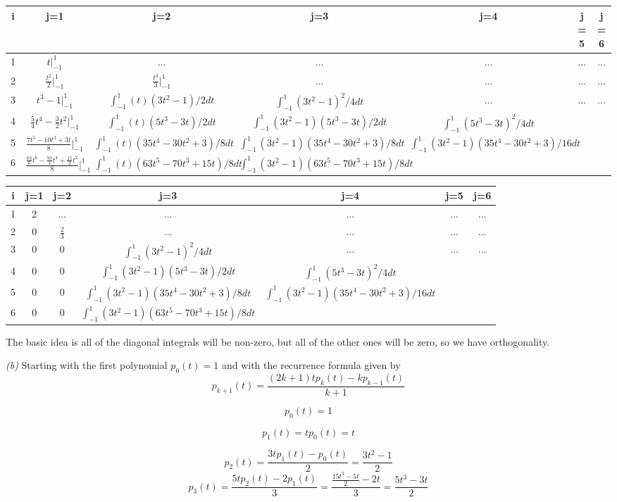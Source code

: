 \documentclass[12pt]{article}
\newenvironment{problem}[2][Problem]{\begin{trivlist}
\item[\hskip \labelsep {\bfseries #1}\hskip \labelsep {\bfseries #2.}]}{\end{trivlist}}
\begin{document}
\begin{problem}{7.10}
\begin{tabular}{|c|c|c|c|c|c| c|}
\hline
i&j=1&j=2&j=3&j=4&j=5&j=6\\
\hline
1&$t\vert_{-1}^{1}$&...&...&...&...&...\\
2&$\frac{t^2}{2}\vert_{-1}^{1}$&$\frac{t^3}{3}\vert_{-1}^{1}$&...&...&...&...\\
3&$t^3-1\vert_{-1}^{1}$&$\int_{-1}^{1}(t)(3t^2-1)/2dt$&$\int_{-1}^{1}(3t^2-1)^2/4dt$&...&...&...\\
4&$\frac{5}{4}t^4-\frac{3}{2}t^2\vert_{-1}^{1}$&$\int_{-1}^{1}(t)(5t^3-3t)/2dt$&$\int_{-1}^{1}(3t^2-1)(5t^3-3t)/2dt$&$\int_{-1}^{1}(5t^3-3t)^2/4dt$\\
5&$\frac{7t^5-10t^3+3t}{8}\vert_{-1}^{1}$&$\int_{-1}^{1}(t)(35t^4-30t^2+3)/8dt$&$\int_{-1}^{1}(3t^2-1)(35t^4-30t^2+3)/8dt$&$\int_{-1}^{1}(3t^2-1)(35t^4-30t^2+3)/16dt$\\
6&$\frac{\frac{63}{6}t^6-\frac{70}{4}t^4+\frac{15}{2}t^2}{8}\vert_{-1}^{1}$&$\int_{-1}^{1}(t)(63t^5-70t^3+15t)/8dt$&$\int_{-1}^{1}(3t^2-1)(63t^5-70t^3+15t)/8dt$\\
\hline
\end{tabular}

\begin{tabular}{|c|c|c|c|c|c| c|}
\hline
i&j=1&j=2&j=3&j=4&j=5&j=6\\
\hline
1&2&...&...&...&...&...\\
2&0&$\frac{2}{3}$&...&...&...&...\\
3&0&0&$\int_{-1}^{1}(3t^2-1)^2/4dt$&...&...&...\\
4&0&0&$\int_{-1}^{1}(3t^2-1)(5t^3-3t)/2dt$&$\int_{-1}^{1}(5t^3-3t)^2/4dt$\\
5&0&0&$\int_{-1}^{1}(3t^2-1)(35t^4-30t^2+3)/8dt$&$\int_{-1}^{1}(3t^2-1)(35t^4-30t^2+3)/16dt$\\
6&0&0&$\int_{-1}^{1}(3t^2-1)(63t^5-70t^3+15t)/8dt$\\
\hline
\end{tabular}

\normalsize
{
\color{red}
The basic idea is all of the diagonal integrals will be non-zero, but all of the other ones will be zero, so we have orthogonality.}

\textit{(b)} Starting with the first polynomial $p_0(t) = 1$ and with the recurrence formula given by
$$p_{k+1}(t)=\frac{(2k+1)tp_k(t)-kp_{k-1}(t)}{k+1}$$

$$p_0(t) = 1$$

$$p_1(t)=tp_0(t)=t$$

$$p_2(t) = \frac{3tp_1(t)-p_0(t)}{2}=\frac{3t^2-1}{2}$$
$$p_3(t) = \frac{5tp_2(t)-2p_1(t)}{3}=\frac{\frac{15t^3 - 5t}{2}-2t}{3}=\frac{5t^3-3t}{2}$$


\end{problem}
\end{document}
